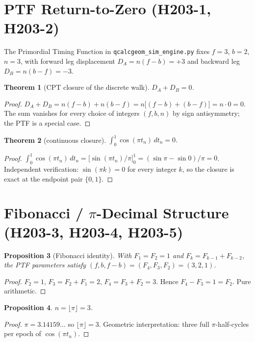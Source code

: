 \documentclass[11pt,letterpaper]{article}
\theoremstyle{plain}
\newtheorem{thm}{Theorem}[section]
\newtheorem{prop}[thm]{Proposition}
\theoremstyle{definition}
\begin{document}
\section{PTF Return-to-Zero (H203-1, H203-2)}

The Primordial Timing Function in
\texttt{qcalcgeom\_sim\_engine.py} fixes
$f = 3$, $b = 2$, $n = 3$, with forward leg displacement
$D_A = n(f-b) = +3$ and backward leg $D_B = n(b-f) = -3$.

\begin{thm}[CPT closure of the discrete walk]
$D_A + D_B = 0$.
\end{thm}

\begin{proof}
$D_A + D_B = n(f-b) + n(b-f) = n\bigl[(f-b) + (b-f)\bigr] = n \cdot 0 = 0$.
The sum vanishes for every choice of integers $(f, b, n)$ by sign
antisymmetry; the PTF is a special case.
\end{proof}

\begin{thm}[continuous closure]
$\displaystyle \int_0^1 \cos(\pi t_n)\,dt_n = 0$.
\end{thm}

\begin{proof}
$\int_0^1 \cos(\pi t_n)\,dt_n
   = \bigl[\sin(\pi t_n)/\pi\bigr]_0^1
   = (\sin \pi - \sin 0)/\pi = 0$.
Independent verification: $\sin(\pi k) = 0$ for every integer $k$, so the
closure is exact at the endpoint pair $\{0,1\}$.
\end{proof}

\section{Fibonacci / $\pi$-Decimal Structure (H203-3, H203-4, H203-5)}

\begin{prop}[Fibonacci identity]
With $F_1 = F_2 = 1$ and $F_k = F_{k-1} + F_{k-2}$, the PTF parameters
satisfy $(f, b, f-b) = (F_4, F_3, F_2) = (3, 2, 1)$.
\end{prop}

\begin{proof}
$F_2 = 1$, $F_3 = F_2 + F_1 = 2$, $F_4 = F_3 + F_2 = 3$. Hence
$F_4 - F_3 = 1 = F_2$. Pure arithmetic.
\end{proof}

\begin{prop}
$n = \lfloor \pi \rfloor = 3$.
\end{prop}

\begin{proof}
$\pi = 3.14159\ldots$ so $\lfloor \pi \rfloor = 3$. Geometric
interpretation: three full $\pi$-half-cycles per epoch of
$\cos(\pi t_n)$.
\end{proof}
\end{document}
